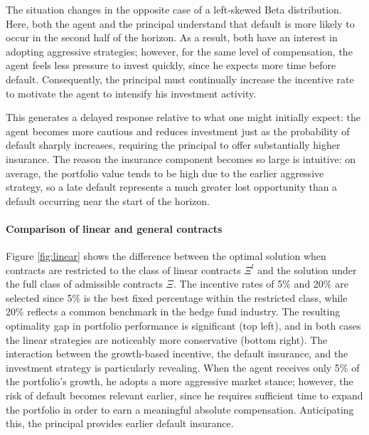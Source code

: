 \documentclass[11pt,a4paper]{article}
\theoremstyle{thmstyleone}%
\theoremstyle{thmstyletwo}%
\theoremstyle{thmstylethree}%
\begin{document}
The situation changes in the opposite case of a left-skewed Beta distribution. Here, both the agent and the principal understand that default is more likely to occur in the second half of the horizon. As a result, both have an interest in adopting aggressive strategies; however, for the same level of compensation, the agent feels less pressure to invest quickly, since he expects more time before default. Consequently, the principal must continually increase the incentive rate to motivate the agent to intensify his investment activity.

This generates a delayed response relative to what one might initially expect: the agent becomes more cautious and reduces investment just as the probability of default sharply increases, requiring the principal to offer substantially higher insurance. The reason the insurance component becomes so large is intuitive: on average, the portfolio value tends to be high due to the earlier aggressive strategy, so a late default represents a much greater lost opportunity than a default occurring near the start of the horizon.

\paragraph{Comparison of linear and general contracts}
Figure \ref{fig:linear} shows the difference between the optimal solution when contracts are restricted to the class of linear contracts $\Xi^{l}$ and the solution under the full class of admissible contracts $\Xi$. The incentive rates of 5\% and 20\% are selected since 5\% is the best fixed percentage within the restricted class, while 20\% reflects a common benchmark in the hedge fund industry. The resulting optimality gap in portfolio performance is significant (top left), and in both cases the linear strategies are noticeably more conservative (bottom right). The interaction between the growth-based incentive, the default insurance, and the investment strategy is particularly revealing. When the agent receives only 5\% of the portfolio’s growth, he adopts a more aggressive market stance; however, the risk of default becomes relevant earlier, since he requires sufficient time to expand the portfolio in order to earn a meaningful absolute compensation. Anticipating this, the principal provides earlier default insurance.
\end{document}

